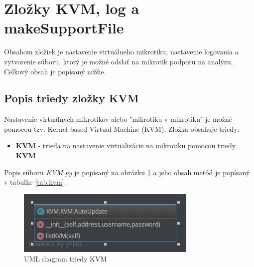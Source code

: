 \section{Zložky KVM, log a makeSupportFile}
Obsahom zložiek je nastavenie virtuálneho mikrotiku, nastavenie logovania a vytvorenie súboru, ktorý je možné odslať na mikrotik podporu na analýzu. Celkový obsah je popísaný nižšie.
\subsection{Popis triedy zložky KVM}
Nastavenie virtuálnych mikrotikov alebo "mikrotiku v mikrotiku" je možné pomocou tzv. Kernel-based Virtual Machine (KVM). Zložka obsahuje triedy:\begin{itemize}
\item \textbf{KVM} - trieda na nastavenie virtualizácie na mikrotiku pomocou triedy \textbf{KVM}
\end{itemize}
Popis súboru \textit{KVM.py} je popísaný na obrázku \ref{fig:kvm}  a jeho obsah metód je popísaný v tabuľke \ref{tab:kvm}.
\begin{table}[H]
\caption{Tabuľka metód triedy KVM}
\label{tab:kvm}
\end{table}
\begin{figure}[H]
\centering
\includegraphics[scale=0.6]{../text/kvmfig.png}
\caption{UML diagram triedy KVM}
\label{fig:kvm}
\end{figure}
